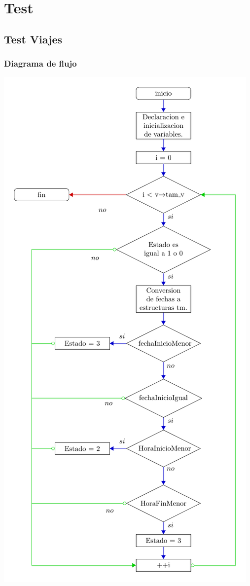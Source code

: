 \section{Test}
\subsection{Test Viajes}
\subsubsection{Diagrama de flujo}
\includegraphics[width=\textwidth, angle=0,scale=0.75]{dep/flujoupviajes.pdf}
